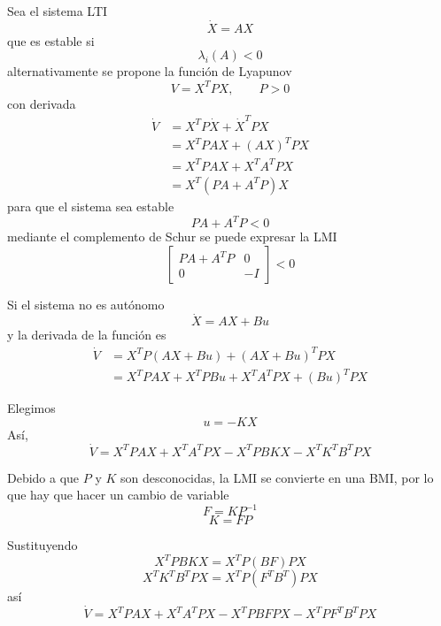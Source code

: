 Sea el sistema LTI
\[
  \dot{X}=AX
\]
que es estable si
\[
  \lambda_i(A)<0
\]
alternativamente se propone la función de Lyapunov
\[
  V=X^{T}PX, \qquad P>0
\]
con derivada
\begin{align*}
  \dot{V}
  &=X^{T}P\dot{X}+\dot{X}^{T}PX\\
  &=X^{T}PAX+(AX)^{T}PX\\
  &=X^{T}PAX+X^{T}A^{T}PX\\
  &=X^{T}(PA+A^{T}P)X
\end{align*}
para que el sistema sea estable
\[
  PA+A^{T}P<0
\]
mediante el complemento de Schur se puede expresar la LMI
\[
  \begin{bmatrix}
    PA+A^{T}P & 0\\
    0 & -I
  \end{bmatrix}<0
\]

Si el sistema no es autónomo
\[
  \dot{X}=AX+Bu
\]
y la derivada de la función es
\begin{align*}
  \dot{V}
  &=X^{T}P(AX+Bu)+(AX+Bu)^{T}PX\\
  &=X^{T}PAX+X^{T}PBu+X^{T}A^{T}PX+(Bu)^{T}PX
\end{align*}

Elegimos
\[
  u=-KX
\]
Así,
\[
  \dot{V}
  =X^{T}PAX+X^{T}A^{T}PX
  -X^{T}PBKX-X^{T}K^{T}B^{T}PX
\]

Debido a que $P$ y $K$ son desconocidas, la LMI se convierte en una BMI, por
lo que hay que hacer un cambio de variable
\[
  F=KP^{-1}
\]
\[
  K=FP
\]

Sustituyendo
\[
  X^{T}PBKX=X^{T}P(BF)PX
\]
\[
  X^{T}K^{T}B^{T}PX=X^{T}P(F^{T}B^{T})PX
\]
así
\[
  \dot{V}
  =X^{T}PAX+X^{T}A^{T}PX
  -X^{T}PBFPX-X^{T}PF^{T}B^{T}PX
\]
